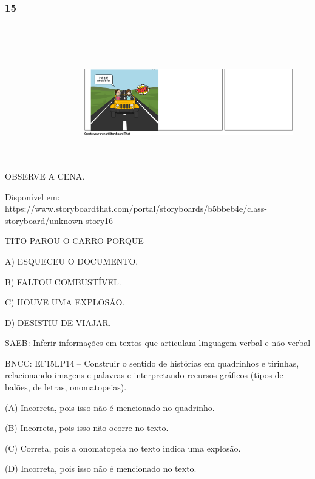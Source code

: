 \subsubsection{15}\label{section-87}

OBSERVE A CENA.\includegraphics[width=3.56528in,height=2.66389in]{media/image254.png}

Disponível em: https://www.storyboardthat.com/portal/storyboards/b5bbeb4e/class-storyboard/unknown-story16

TITO PAROU O CARRO PORQUE

A) ESQUECEU O DOCUMENTO.

B) FALTOU COMBUSTÍVEL.

C) HOUVE UMA EXPLOSÃO.

D) DESISTIU DE VIAJAR.

SAEB: Inferir informações em textos que articulam linguagem
verbal e não verbal

BNCC: EF15LP14 -- Construir o sentido de histórias em
quadrinhos e tirinhas, relacionando imagens e palavras e interpretando
recursos gráficos (tipos de balões, de letras, onomatopeias).

(A) Incorreta, pois isso não é mencionado no quadrinho.

(B) Incorreta, pois isso não ocorre no texto.

(C) Correta, pois a onomatopeia no texto indica uma explosão.

(D) Incorreta, pois isso não é mencionado no texto.